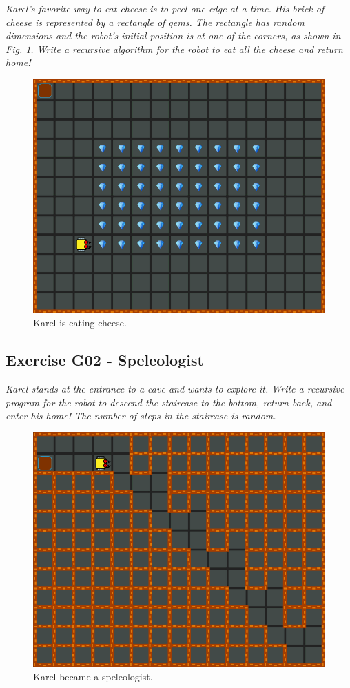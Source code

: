 {{{{{\em Karel's favorite way to eat cheese is to peel one edge at a time. His brick of 
cheese is represented by a rectangle of gems. The rectangle has random dimensions
and the robot's initial position is at one of the corners, as shown in Fig. \ref{fig:g01}.
Write a recursive algorithm for the robot to eat all the cheese and return home!\\[-7mm]
 }
\begin{figure}[!ht]
\begin{center}
\includegraphics[height=0.4\textwidth]{imgk/g01.png}
\end{center}
\vspace{-4mm}
\caption{Karel is eating cheese.}
\label{fig:g01}
\vspace{-1cm}
\end{figure}
\newpage
\noindent

\subsection{Exercise G02 - Speleologist}

{\em Karel stands at the entrance to a cave and wants to explore it. Write a recursive program for the robot to descend the staircase to the bottom, return back, and enter his home! The number of steps in the staircase is random.}
\begin{figure}[!ht]
\begin{center}
\includegraphics[height=0.4\textwidth]{imgk/g02.png}
\end{center}
\vspace{-4mm}
\caption{Karel became a speleologist.}
\label{fig:g02}
\vspace{-4mm}
\end{figure}
\noindent

}}}}
